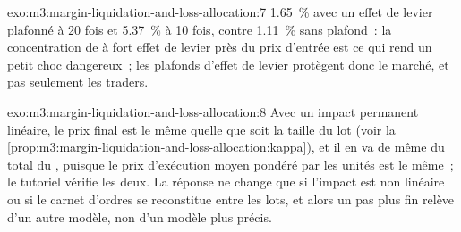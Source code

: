 \begin{solution}{exo:m3:margin-liquidation-and-loss-allocation:7}
1.65~\% avec un effet de levier plafonné à 20 fois et 5.37~\% à 10 fois, contre 1.11~\% sans plafond~: la concentration de  à fort
effet de levier près du prix d'entrée est ce qui rend un petit choc dangereux~; les plafonds d'effet de levier protègent donc le marché, et pas seulement
les traders.
\end{solution}

\begin{solution}{exo:m3:margin-liquidation-and-loss-allocation:8}
Avec un impact permanent linéaire, le prix final est le même quelle que soit la taille du lot
(voir la \cref{prop:m3:margin-liquidation-and-loss-allocation:kappa}), et il en va de même du total du , puisque le prix d'exécution moyen pondéré par les unités
est le même~; le tutoriel vérifie les deux. La réponse ne change que si l'impact est non linéaire ou si le carnet d'ordres se reconstitue entre les lots, et alors un pas plus fin
relève d'un autre modèle, non d'un modèle plus précis.
\end{solution}

